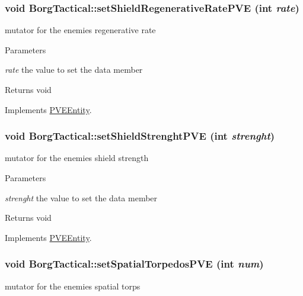 \hypertarget{classBorgTactical_a65e3232f49c6f8c3e318c4e3626f926c}{
\subsubsection[{setShieldRegenerativeRatePVE}]{\setlength{\rightskip}{0pt plus 5cm}void BorgTactical::setShieldRegenerativeRatePVE (int {\em rate})}}
\label{d0/d4e/classBorgTactical_a65e3232f49c6f8c3e318c4e3626f926c}
mutator for the enemies regenerative rate


\begin{DoxyParams}{Parameters}
\item[{\em rate}]the value to set the data member\end{DoxyParams}
\begin{DoxyReturn}{Returns}
void 
\end{DoxyReturn}


Implements \hyperlink{classPVEEntity}{PVEEntity}.

\hypertarget{classBorgTactical_a193a199b54952f5bdae9d567402a35ba}{
\subsubsection[{setShieldStrenghtPVE}]{\setlength{\rightskip}{0pt plus 5cm}void BorgTactical::setShieldStrenghtPVE (int {\em strenght})}}
\label{d0/d4e/classBorgTactical_a193a199b54952f5bdae9d567402a35ba}
mutator for the enemies shield strength


\begin{DoxyParams}{Parameters}
\item[{\em strenght}]the value to set the data member\end{DoxyParams}
\begin{DoxyReturn}{Returns}
void 
\end{DoxyReturn}


Implements \hyperlink{classPVEEntity}{PVEEntity}.

\hypertarget{classBorgTactical_a9266ebc1f9df7c6e970537928d2211db}{
\subsubsection[{setSpatialTorpedosPVE}]{\setlength{\rightskip}{0pt plus 5cm}void BorgTactical::setSpatialTorpedosPVE (int {\em num})}}
\label{d0/d4e/classBorgTactical_a9266ebc1f9df7c6e970537928d2211db}
mutator for the enemies spatial torps


